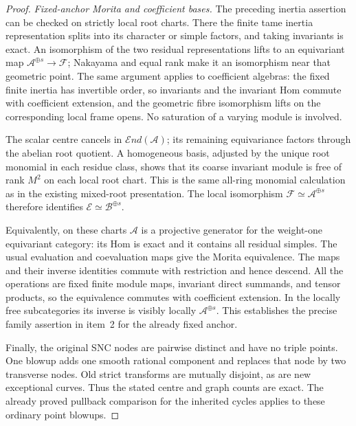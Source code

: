 \begin{proof}
\emph{Fixed-anchor Morita and coefficient bases.}
The preceding inertia assertion can be checked on
strictly local root charts. There the finite tame
inertia representation splits into its character
or simple factors, and taking invariants is exact.
An isomorphism of the two residual representations
lifts to an equivariant map
\(\mathcal A^{\oplus s}\to\mathcal F\);
Nakayama and equal rank make it an isomorphism
near that geometric point. The same argument
applies to coefficient algebras: the fixed finite
inertia has invertible order, so invariants and
the invariant Hom commute with coefficient
extension, and the geometric fibre isomorphism
lifts on the corresponding local frame opens.
No saturation of a varying module is involved.

The scalar centre cancels in
\(\mathcal End(\mathcal A)\); its remaining
equivariance factors through the abelian root
quotient. A homogeneous basis, adjusted by the
unique root monomial in each residue class,
shows that its coarse invariant module is free
of rank \(M^2\) on each local root chart.
This is the same all-ring monomial calculation
as in the existing mixed-root presentation.
The local isomorphism
\(\mathcal F\simeq\mathcal A^{\oplus s}\)
therefore identifies
\(\mathcal E\simeq\mathcal B^{\oplus s}\).

Equivalently, on these charts \(\mathcal A\) is
a projective generator for the weight-one
equivariant category: its Hom is exact and it
contains all residual simples. The usual
evaluation and coevaluation maps give the
Morita equivalence. The maps and their inverse
identities commute with restriction and hence
descend. All the operations are fixed finite
module maps, invariant direct summands, and
tensor products, so the equivalence commutes
with coefficient extension. In the locally
free subcategories its inverse is visibly
locally \(\mathcal A^{\oplus s}\).
This establishes the precise family assertion
in item~2 for the already fixed anchor.

Finally, the original SNC nodes are pairwise
distinct and have no triple points. One blowup
adds one smooth rational component and replaces
that node by two transverse nodes. Old strict
transforms are mutually disjoint, as are new
exceptional curves. Thus the stated centre
and graph counts are exact. The already proved
pullback comparison for the inherited cycles
applies to these ordinary point blowups.
\end{proof}

